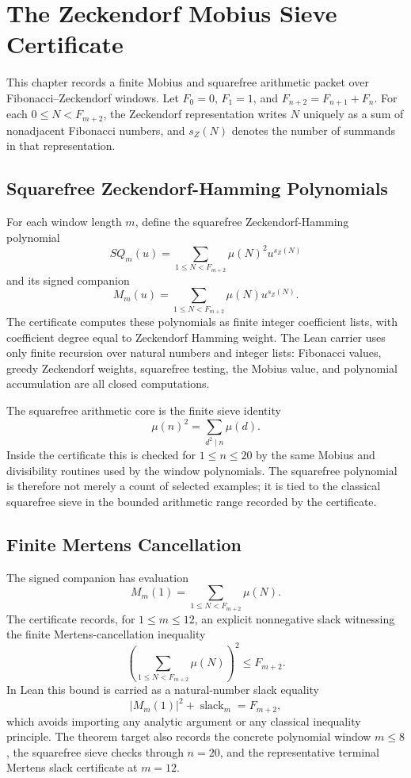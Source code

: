 \chapter{The Zeckendorf Mobius Sieve Certificate}
\label{ch:concrete-instances-zeckendorf-mobius-sieve}

This chapter records a finite Mobius and squarefree arithmetic packet over Fibonacci--Zeckendorf windows. Let $F_0=0$, $F_1=1$, and $F_{n+2}=F_{n+1}+F_n$. For each $0\leq N<F_{m+2}$, the Zeckendorf representation writes $N$ uniquely as a sum of nonadjacent Fibonacci numbers, and $s_Z(N)$ denotes the number of summands in that representation.

\section{Squarefree Zeckendorf-Hamming Polynomials}
\label{sec:zeckendorf-mobius-squarefree-polynomials}

For each window length $m$, define the squarefree Zeckendorf-Hamming polynomial
$$
SQ_m(u)=\sum_{1\leq N<F_{m+2}}\mu(N)^2u^{s_Z(N)}
$$
and its signed companion
$$
M_m(u)=\sum_{1\leq N<F_{m+2}}\mu(N)u^{s_Z(N)}.
$$
The certificate computes these polynomials as finite integer coefficient lists, with coefficient degree equal to Zeckendorf Hamming weight. The Lean carrier uses only finite recursion over natural numbers and integer lists: Fibonacci values, greedy Zeckendorf weights, squarefree testing, the Mobius value, and polynomial accumulation are all closed computations.

The squarefree arithmetic core is the finite sieve identity
$$
\mu(n)^2=\sum_{d^2\mid n}\mu(d).
$$
Inside the certificate this is checked for $1\leq n\leq 20$ by the same Mobius and divisibility routines used by the window polynomials. The squarefree polynomial is therefore not merely a count of selected examples; it is tied to the classical squarefree sieve in the bounded arithmetic range recorded by the certificate.

\section{Finite Mertens Cancellation}
\label{sec:zeckendorf-mobius-mertens-cancellation}

The signed companion has evaluation
$$
M_m(1)=\sum_{1\leq N<F_{m+2}}\mu(N).
$$
The certificate records, for $1\leq m\leq 12$, an explicit nonnegative slack witnessing the finite Mertens-cancellation inequality
$$
\left(\sum_{1\leq N<F_{m+2}}\mu(N)\right)^2\leq F_{m+2}.
$$
In Lean this bound is carried as a natural-number slack equality
$$
|M_m(1)|^2+\operatorname{slack}_m=F_{m+2},
$$
which avoids importing any analytic argument or any classical inequality principle. The theorem target also records the concrete polynomial window $m\leq 8$, the squarefree sieve checks through $n=20$, and the representative terminal Mertens slack certificate at $m=12$.

